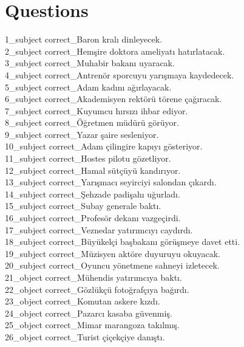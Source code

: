 \section{Questions}
\begin{myparindent}{0pt}
1\_subject correct\_Baron kralı dinleyecek. \\
2\_subject correct\_Hemşire doktora ameliyatı hatırlatacak. \\
3\_subject correct\_Muhabir bakanı uyaracak. \\
4\_subject correct\_Antrenör sporcuyu yarışmaya kaydedecek. \\
5\_subject correct\_Adam kadını ağırlayacak. \\
6\_subject correct\_Akademisyen rektörü törene çağıracak. \\
7\_subject correct\_Kuyumcu hırsızı ihbar ediyor. \\
8\_subject correct\_Öğretmen müdürü görüyor. \\
9\_subject correct\_Yazar şaire sesleniyor. \\
10\_subject correct\_Adam çilingire kapıyı gösteriyor. \\
11\_subject correct\_Hostes pilotu gözetliyor. \\
12\_subject correct\_Hamal sütçüyü kandırıyor. \\
13\_subject correct\_Yarışmacı seyirciyi salondan çıkardı. \\
14\_subject correct\_Şehzade padişahı uğurladı. \\
15\_subject correct\_Subay generale baktı. \\
16\_subject correct\_Profesör dekanı vazgeçirdi. \\
17\_subject correct\_Veznedar yatırımcıyı caydırdı. \\
18\_subject correct\_Büyükelçi başbakanı görüşmeye davet etti. \\
19\_subject correct\_Müzisyen aktöre duyuruyu okuyacak. \\
20\_subject correct\_Oyuncu yönetmene sahneyi izletecek. \\
21\_object correct\_Mühendis yatırımcıya baktı. \\
22\_object correct\_Gözlükçü fotoğrafçıya bağırdı. \\
23\_object correct\_Komutan askere kızdı. \\
24\_object correct\_Pazarcı kasaba güvenmiş. \\
25\_object correct\_Mimar marangoza takılmış. \\
26\_object correct\_Turist çiçekçiye danıştı. \\

\end{myparindent}
